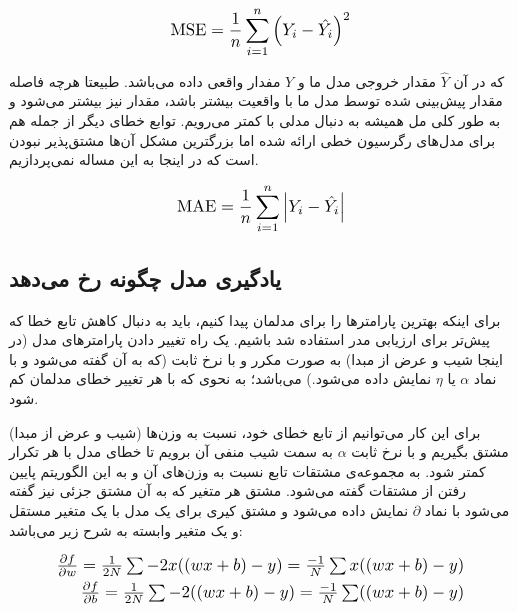 \documentclass[a4paper, titlepage]{article}
\begin{document}
\begin{equation}
    \scalebox{1.2}{${\displaystyle \operatorname {MSE} ={\frac {1}{n}}\sum _{i=1}^{n}\left(Y_{i}-{\hat {Y_{i}}}\right)^{2}}$}
\end{equation}

که در آن $\hat{Y}$ مقدار خروجی مدل ما و $Y$ مفدار واقعی داده می‌باشد. طبیعتا هرچه فاصله مقدار پیش‌بینی شده توسط مدل ما با واقعیت بیشتر باشد، مقدار  نیز بیشتر می‌شود و به طور کلی مل همیشه به دنبال مدلی با  کمتر می‌رویم. توابع خطای دیگر از جمله  هم برای مدل‌های رگرسیون خطی ارائه شده اما بزرگترین مشکل آن‌ها مشتق‌پذیر نبودن است که در اینجا به این مساله نمی‌پردازیم.

\begin{equation}
    \scalebox{1.2}{${\displaystyle \operatorname {MAE} ={\frac {1}{n}}\sum _{i=1}^{n}\left|Y_{i}-{\hat {Y_{i}}}\right|}$}
\end{equation}

\subsection{یادگیری مدل چگونه رخ می‌دهد}
برای اینکه بهترین پارامتر‌ها را برای مدلمان پیدا کنیم، باید به دنبال کاهش تابع خطا که پیش‌تر برای ارزیابی مدر استفاده شد باشیم.
یک راه تغییر دادن پارامتر‌های مدل (در اینجا شیب و عرض از مبدا) به صورت مکرر و با نرخ ثابت (که به آن  گفته می‌شود و با نماد $\alpha$ یا $\eta$ نمایش داده می‌شود.) می‌باشد؛ به نحوی که با هر تغییر خطای مدلمان کم شود.

برای این کار می‌توانیم از تابع خطای خود، نسبت به وزن‌‌ها (شیب و عرض از مبدا) مشتق بگیریم و با نرخ ثابت $\alpha$ به سمت شیب منفی آن برویم تا خطای مدل با هر تکرار کمتر شود.
به مجموعه‌ی مشتقات تابع نسبت به وزن‌های آن  و به این الگوریتم پایین رفتن از مشتقات  گفته می‌شود. مشتق هر متغیر که به آن مشتق جزئی نیز گفته می‌شود با نماد $\partial$ نمایش داده می‌شود و مشتق کیری برای یک مدل با یک متغیر مستقل و یک متغیر وابسته به شرح زیر می‌باشد:

\begin{equation}
    \begin{split}
        \scalebox{1.2}{$\frac{\partial f}{\partial w} = \frac{1}{2N} \sum -2x((wx + b) - y) = \frac{-1}{N} \sum x((wx + b) - y)$} \\
        \scalebox{1.2}{$\frac{\partial f}{\partial b} = \frac{1}{2N} \sum -2((wx + b) - y) = \frac{-1}{N} \sum ((wx + b) - y)$}
    \end{split}        
\end{equation}
\end{document}
